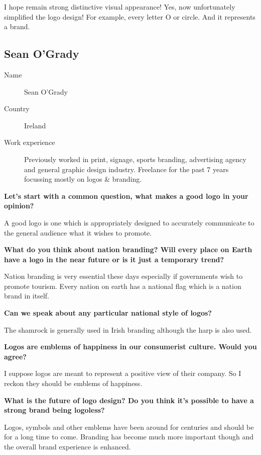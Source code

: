 I hope remain strong distinctive visual appearance! Yes, now unfortunately
simplified the logo design! For example, every letter O or circle. And it
represents a brand.


\clearpage
\subsection{Sean O'Grady}

\begin{description}
\item[Name] Sean O'Grady
\item[Country] Ireland
\item[Work experience] Previously worked in print, signage, sports branding,
  advertising agency and general graphic design industry. Freelance for the past
  7 years focussing mostly on logos \& branding.
\end{description}

\textbf{Let's start with a common question, what makes a good logo in your
  opinion?}

A good logo is one which is appropriately designed to accurately communicate to
the general audience what it wishes to promote.


\textbf{What do you think about nation branding? Will every place on Earth have
  a logo in the near future or is it just a temporary trend?}

Nation branding is very essential these days especially if governments wish to
promote tourism. Every nation on earth has a national flag which is a nation
brand in itself.


\textbf{Can we speak about any particular national style of logos?}

The shamrock is generally used in Irish branding although the harp is also used.


\textbf{Logos are emblems of happiness in our consumerist culture. Would you
  agree?}

I suppose logos are meant to represent a positive view of their company. So I
reckon they should be emblems of happiness.


\textbf{What is the future of logo design? Do you think it's possible to have a
  strong brand being logoless?}

Logos, symbols and other emblems have been around for centuries and should be
for a long time to come. Branding has become much more important though and the
overall brand experience is enhanced.


\clearpage
